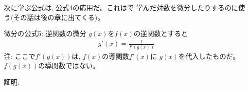 次に学ぶ公式は, 公式4の応用だ。これはで
学んだ対数を微分したりするのに使う(その話は後の章に出てくる)。

\begin{itembox}{微分の公式5: 逆関数の微分}
$g(x)$を$f(x)$の逆関数とすると
\begin{eqnarray}
g'(x)=\frac{1}{f'(g(x))}\label{eq:diff_form5}
\end{eqnarray}
注: ここで$f'(g(x))$は, $f(x)$の導関数$f'(x)$に
$g(x)$を代入したものだ。$f(g(x))$の導関数ではない。
\end{itembox}
証明: 

